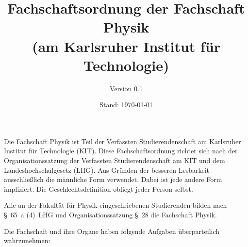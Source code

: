 \documentclass[a4paper,parskip=half,numbers=noenddot]{scrartcl}
\title{Fachschaftsordnung der Fachschaft Physik\\(am Karlsruher Institut für Technologie)}
\author{Version 0.1}
\date{Stand: \today}
\begin{document}
\pagestyle{empty}
\maketitle
\newpage 
\rule{0mm}{0mm} \newpage %


\begin{contract}
\setcounter{page}{1}
\pagestyle{plain}
\tableofcontents
\newpage



Die Fachschaft Physik ist Teil der Verfassten Studierendenschaft am Karlsruher Institut für Technologie (KIT). Diese Fachschaftsordnung richtet sich nach der Organisationssatzung der Verfassten Studierendenschaft am KIT und dem Landeshochschulgesetz (LHG). Aus Gründen der besseren Lesbarkeit ausschließlich die männliche Form verwendet. Dabei ist jede andere Form impliziert. Die Geschlechtsdefinition obliegt jeder Person selbst.

%
%



Alle an der Fakultät für Physik eingeschriebenen Studierenden 
bilden nach  §~65~a (4)~LHG und Organisationssatzung §~28 die Fachschaft Physik.

\label{studierendenschaft:aufgaben}

Die Fachschaft und ihre Organe haben folgende Aufgaben überparteilich wahrzunehmen:


\end{contract}
\end{document}
